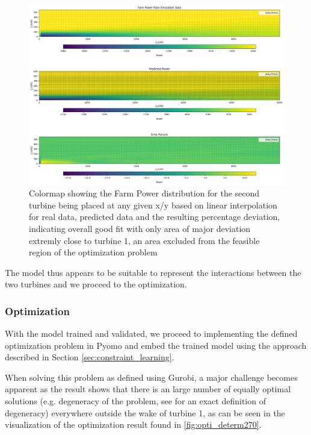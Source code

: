\begin{figure}[h] 
	\centering
	\includegraphics[width=1\textwidth]{figures/optimization/determ_model_colormap.png} 
	\caption{Colormap showing the Farm Power distribution for the second turbine being placed at any given x/y based on linear interpolation for real data, predicted data and the resulting percentage deviation, indicating overall good fit with only area of major deviation extremly close to turbine 1, an area excluded from the feasible region of the optimization problem }
	\label{fig:determ_model_colormap}
\end{figure}

The model thus appears to be suitable to represent the interactions between the two turbines and we proceed to the optimization.

\subsubsection{Optimization}


With the model trained and validated, we proceed to implementing the defined optimization problem in Pyomo  and embed the trained model using the approach described in Section \ref{sec:constraint_learning}.

When solving this problem as defined using Gurobi, a major challenge becomes apparent as the result shows that there is an large number of equally optimal solutions (e.g. degeneracy of the problem, see  \cite{vanderbei2020chapter3} for an exact definition of degeneracy) everywhere outside the wake of turbine 1, as can be seen  in the visualization of the optimization result found in \ref{fig:opti_determ270}.


